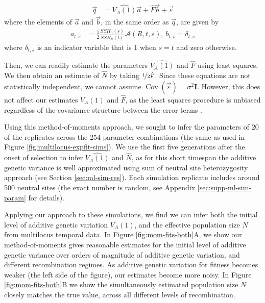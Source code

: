 \documentclass[11pt]{article}
\DeclareMathOperator{\cov}{Cov}
\newcommand{\nssh}{SSH_n}
\begin{document}
\begin{align}
 \vec{q} &= \widehat{V_A(1)} \vec{a} + \widehat{F} \vec{b} + \vec{\varepsilon}  
 \label{eq:mom-regression} 
\end{align}
where the elements of $\vec{a}$  and $\vec{b}$, in the same order as $\vec{q}$, are given by
\begin{align}
  a_{t,s} &= \frac{1}{2}\frac{\nssh(s)}{\nssh(t)}\mathcal{A}(R, t,s),~ b_{t,s} = \delta_{t,s}
\end{align}
%
where $\delta_{t,s}$ is an indicator variable that is $1$ when $s=t$
and zero otherwise.

Then, we can readily estimate the parameters $\widehat{V_A(1)}$ and
$\widehat{F}$ using least squares. We then obtain an estimate of $\widehat{N}$
by taking $\nicefrac{1}{2\widehat{F}}$. Since these equations are not
statistically independent, we cannot assume $\cov(\vec{\varepsilon}) = \sigma^2
\mathbf{I}$. However, this does not affect our estimates $\widehat{V_A(1)}$ and
$\widehat{F}$, as the least squares procedure is unbiased regardless of the
covariance structure between the error terms \parencite[p.
26]{Christensen2011-cg}.


Using this method-of-moments approach, we sought to infer the parameters of 20
of the replicates across the 254 parameter combinations (the same as used in
Figure \ref{fig:multilocus-expfit-sims}). We use the first five generations
after the onset of selection to infer $\widehat{V_A(1)}$ and $\widehat{N}$, as
for this short timespan the additive genetic variance is well approximated
using sum of neutral site heterozygosity approach (see Section
\ref{sec:ml-sim-res}). Each simulation replicate includes around 500 neutral
sites (the exact number is random, see Appendix \ref{sec:supp-ml-sim-param} for
details).

Applying our approach to these simulations, we find we can infer both the
initial level of additive genetic variation $V_A(1)$, and the effective
population size $N$ from multilocus temporal data. In Figure
\ref{fig:mom-fits-both}A, we show our method-of-moments gives
reasonable estimates for the initial level of additive genetic variance over
orders of magnitude of additive genetic variation, and different recombination
regimes. As additive genetic variation for fitness becomes weaker (the left
side of the figure), our estimates become more noisy. In Figure
\ref{fig:mom-fits-both}B we show the simultaneously estimated
population size $N$ closely matches the true value, across all different levels
of recombination.
\end{document}
